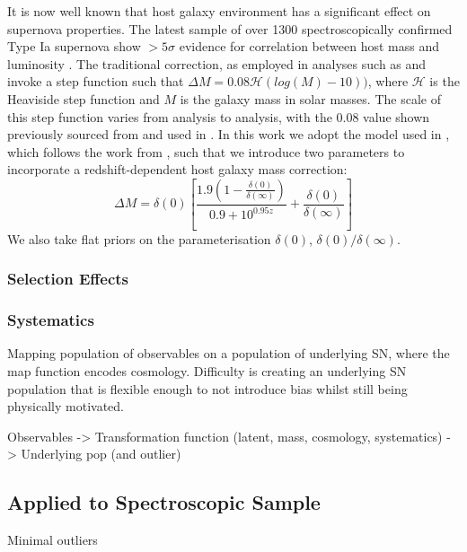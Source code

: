 \documentclass[a4paper,fleqn,usenatbib]{mnras}
\newcommand{\rubin}{\citetalias{Rubin2015}}
\begin{document}
It is now well known that host galaxy environment has a significant effect on supernova properties. The latest sample of over 1300 spectroscopically confirmed Type Ia supernova show $>5\sigma$ evidence for correlation between host mass and luminosity \citep{Uddin2017}. The traditional correction, as employed in analyses such as \citet{Suzuki2012} and \citet{Betoule2014} invoke a step function such that $\Delta M = 0.08 \mathcal{H}(log(M) - 10))$, where $\mathcal{H}$ is the Heaviside step function and $M$ is the galaxy mass in solar masses. The scale of this step function varies from analysis to analysis, with the 0.08 value shown previously sourced from \cite{Sullivan2010} and used in \citet{Betoule2014}. In this work we adopt the model used in {\rubin}, which follows the work from \citet{Rigault2013}, such that we introduce two parameters to incorporate a redshift-dependent host galaxy mass correction:
\begin{equation}
\Delta M = \delta(0) \left[ \frac{1.9\left(1 - \frac{\delta(0)}{\delta(\infty)}\right)  }{0.9 + 10^{0.95z}} + \frac{\delta(0)}{\delta(\infty)}\right]
\end{equation}
We also take flat priors on the parameterisation $\delta(0)$, $\delta(0)/\delta(\infty)$.


\subsubsection{Selection Effects}

\subsubsection{Systematics}



\vspace{20mm}
Mapping population of observables on a population of underlying SN, where the map function encodes
cosmology. Difficulty is creating an underlying SN population that is flexible enough to not introduce bias whilst still being physically motivated. 


Observables -> Transformation function (latent, mass, cosmology, systematics) -> Underlying pop (and outlier)

\subsection{Applied to Spectroscopic Sample}

Minimal outliers
\end{document}

